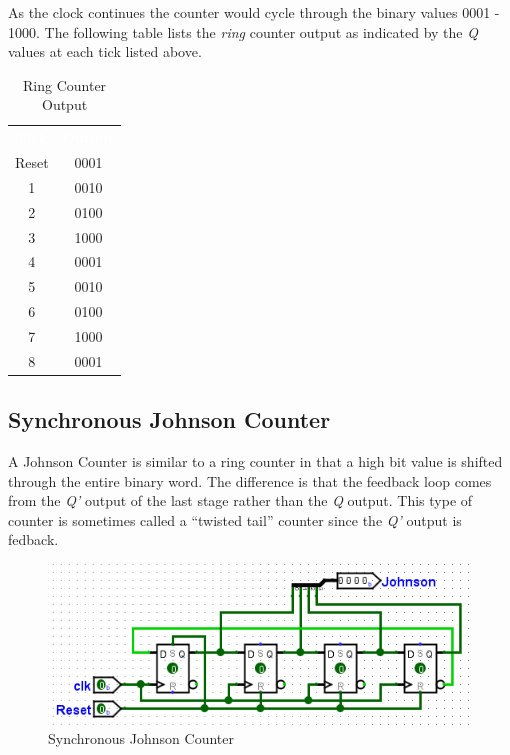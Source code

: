 As the clock continues the counter would cycle through the binary values 0001 - 1000. The following table lists the \textit{ring} counter output as indicated by the \textit{Q} values at each tick listed above.

\begin{table}[H]
	\sffamily
	\newcommand{\head}[1]{\textcolor{white}{\textbf{#1}}}		
	\begin{center}
		\begin{tabular}{cc} 
			\rowcolor{black!75}
			\head{Tick} & \head{Output} \\
			Reset & 0001 \\
			1 & 0010 \\
			2 & 0100 \\
			3 & 1000 \\
			4 & 0001 \\
			5 & 0010 \\
			6 & 0100 \\
			7 & 1000 \\
			8 & 0001 
		\end{tabular}
	\end{center}
	\caption{Ring Counter Output}
	\label{tab0604}
\end{table}

\subsection{Synchronous Johnson Counter}

A Johnson Counter is similar to a ring counter in that a high bit value is shifted through the entire binary word. The difference is that the feedback loop comes from the \textit{Q'} output of the last stage rather than the \textit{Q} output. This type of counter is sometimes called a ``twisted tail'' counter since the \textit{Q'} output is fedback.

\begin{figure}[H]
	\centering
	\includegraphics[width=\maxwidth{.95\linewidth}]{gfx/count-05}
	\caption{Synchronous Johnson Counter}
	\label{fig:count-05}
\end{figure}

